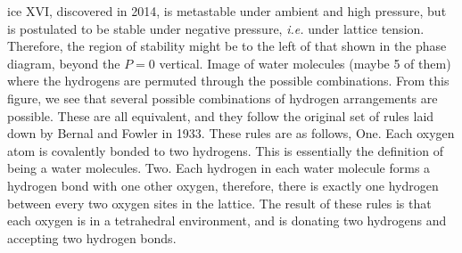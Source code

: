 ice XVI, discovered in 2014, is metastable under ambient and high
pressure, but is postulated to be stable under negative pressure,
\textit{i.e.} under lattice tension. Therefore, the region of
stability might be to the left of that shown in the phase diagram,
beyond the $P = 0$ vertical. Image of water molecules (maybe 5 of
them) where the hydrogens are permuted through the possible
combinations. From this figure, we see that several possible
combinations of hydrogen arrangements are possible. These are all
equivalent, and they follow the original set of rules laid down by
Bernal and Fowler in 1933. These rules are as follows,
One. Each oxygen atom is covalently bonded to two hydrogens. This is
essentially the definition of being a water molecules. Two. Each
hydrogen in each water molecule forms a hydrogen bond with one other
oxygen, therefore, there is exactly one hydrogen between every two
oxygen sites in the lattice. The result of these rules is that each
oxygen is in a tetrahedral environment, and is donating two hydrogens
and accepting two hydrogen bonds. 

